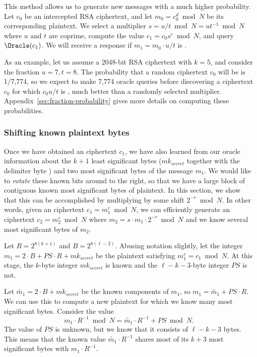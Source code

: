 This method allows us to generate new \sslconform messages with a much higher probability. 
Let $c_0$ be an intercepted \tlsconform RSA ciphertext, and let $m_0 = c_0^d \bmod N$ be its corresponding plaintext.  We select a multiplier $s = u/t \bmod N = u t^{-1} \bmod N$ where $u$ and $t$ are coprime, compute the value $c_1 = c_0 s^e \bmod N$, and query $\Oracle(c_1)$.  We will receive a response if $m_1 = m_0 \cdot u/t$ is \sslconform.  

As an example, let us assume a 2048-bit RSA ciphertext with $k = 5$, and consider the fraction $u = 7, t = 8$.  The probability that a random ciphertext $c_0$ will be \sslconform is 1/7,774, so we expect to make 7,774 oracle queries before discovering a ciphertext $c_0$ for which $c_0 u/t$ is \sslconform, much better than a randomly selected multiplier. Appendix~\ref{sec:fraction-probability} gives more details on computing these probabilities.

\subsubsection{Shifting known plaintext bytes}
\label{sec:rotations}
Once we have obtained an \sslconform ciphertext $c_1$, we have also learned from our oracle information about the $k+1$ least significant bytes ($mk_{secret}$ together with the delimiter byte ) and two most significant  bytes of the \sslconform message $m_1$.  We would like to \emph{rotate} these known bits around to the right, so that we have a large block of contiguous known most significant bytes of plaintext.
In this section, we show that this can be accomplished by multiplying by some shift $2^{-r} \bmod N$.  In other words, given an \sslconform ciphertext $c_1 = m_1^e \bmod N$, we can efficiently generate an \sslconform ciphertext $c_2 = m_2^e \bmod N$ where $m_2 = s \cdot m_1 \cdot 2^{-r} \bmod N$ and we know several most significant bytes of $m_2$. 

Let $R = 2^{8(k+1)}$ and $B = 2^{8(\ell-2)}$. Abusing notation slightly, let the integer $m_1 = 2 \cdot B + PS \cdot R + mk_{secret}$ be the plaintext satisfying $m_1^e = c_1 \bmod N$.  At this stage, the $k$-byte integer $mk_{secret}$ is known and the $\ell-k-3$-byte integer $PS$ is not.

Let $\tilde{m_1} = 2 \cdot B + mk_{secret}$ be the known components of $m_1$, so $m_1 = \tilde{m_1} + PS \cdot R$. We can use this to compute a new plaintext for which we know many most significant bytes.  Consider the value 
\[
m_1 \cdot R^{-1} \bmod N = \tilde{m_1} \cdot R^{-1} + PS \bmod N.
\]
The value of $PS$ is unknown, but we know that it consists of $\ell-k-3$ bytes.  This means that the known value $\tilde{m_1} \cdot R^{-1}$ shares most of its $k+3$ most significant bytes with $m_1 \cdot R^{-1}$.

